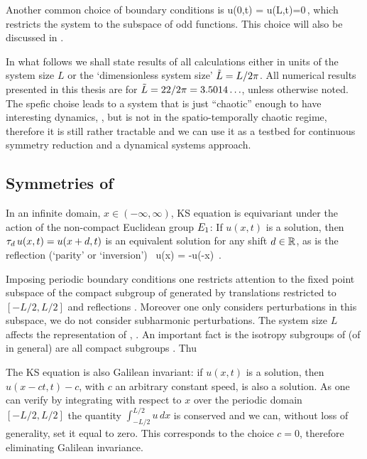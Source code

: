 Another common choice of boundary conditions is 
\beq
  u(0,t) = u(L,t)=0\,,
 \label{eq:KSper}
\eeq
which restricts the system to the subspace of odd functions. This choice will also be discussed
in .

In what follows
we shall state results of all calculations either in units of the system size $L$
or the `dimensionless system size' $\tilde{L}=L/2\pi$. 
All numerical results presented in this thesis
are for $\tilde{L}=22/2\pi = 3.5014\ldots$, unless otherwise
noted. The spefic choise leads to a system that is just ``chaotic'' enough 
to have interesting dynamics, \cf {}, but is not in the spatio-temporally chaotic
regime, therefore it is still rather tractable and we can use it as a testbed for
continuous symmetry reduction and a dynamical systems approach.


\subsection{Symmetries of \KSe}
\label{sec:KSeSymm}

In an infinite domain, $x\in(-\infty,\infty)$, KS equation is equivariant
under the action of the non-compact Euclidean group $E_{1}$:
If $u(x,t)$ is a solution, then
$\tau_{d}\, u(x,t) = u(x+d,t)$
is an equivalent solution for any shift
$d\in\mathbb{R}^{}$, as is the reflection (`parity' or `inversion')
\beq
    \Refl \, u(x) = -u(-x)
\,.

Imposing periodic boundary conditions one restricts attention to the fixed
point subspace of the compact subgroup  of  generated by translations
restricted to $\left[-L/2,L/2\right]$ and reflections .
Moreover one only considers perturbations in this subspace, \ie we do not
consider subharmonic perturbations. The system size $L$ affects the representation
of , \cf {}. An important fact is the isotropy subgroups of
 (of  in general) are all compact subgroups \cite[for example]{ChossLaut00}.
Thu

The KS equation is also Galilean invariant: if $u(x,t)$ is a solution,
then $u(x -ct,t) -c $, with $c$ an arbitrary constant
speed, is also a solution. As one can verify by integrating  with 
respect to $x$ over the periodic domain $[-L/2,L/2]$ the quantity
 $\int_{-L/2}^{L/2} u\,dx$ 
is conserved and we can, without loss of generality, set it equal to zero. This corresponds
to the choice $c=0$, therefore eliminating Galilean invariance.

